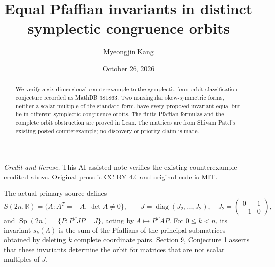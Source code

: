 \documentclass[11pt]{article}
\title{Equal Pfaffian invariants in distinct symplectic congruence orbits}
\author{Myeongjin Kang}
\date{October 26, 2026}
\begin{document}
\maketitle
\begin{abstract}
We verify a six-dimensional counterexample to the symplectic-form orbit-classification conjecture recorded as MathDB 381863. Two nonsingular skew-symmetric forms, neither a scalar multiple of the standard form, have every proposed invariant equal but lie in different symplectic congruence orbits. The finite Pfaffian formulas and the complete orbit obstruction are proved in Lean. The matrices are from Shivam Patel's existing posted counterexample; no discovery or priority claim is made.
\end{abstract}
\noindent\textit{Credit and license.} This AI-assisted note verifies the existing counterexample credited above. Original prose is CC BY 4.0 and original code is MIT.

The actual primary source defines
\[
 S(2n,\mathbb R)=\{A:A^T=-A,\ \det A\ne0\},\qquad
 J=\operatorname{diag}(J_2,\ldots,J_2),\quad
 J_2=\begin{pmatrix}0&1\\-1&0\end{pmatrix},
\]
and $\operatorname{Sp}(2n)=\{P:P^TJP=J\}$, acting by $A\mapsto P^TAP$. For $0\le k<n$, its invariant $s_k(A)$ is the sum of the Pfaffians of the principal submatrices obtained by deleting $k$ complete coordinate pairs. Section 9, Conjecture 1 asserts that these invariants determine the orbit for matrices that are not scalar multiples of $J$.
\end{document}
